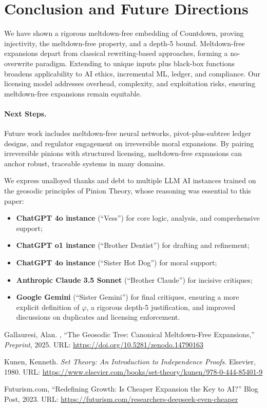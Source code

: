 \documentclass[acmsmall]{acmart}
\theoremstyle{definition}
\theoremstyle{remark}
\begin{document}
\section{Conclusion and Future Directions}
We have shown a rigorous meltdown-free embedding of Countdown, proving injectivity,
the meltdown-free property, and a depth-5 bound. Meltdown-free expansions depart
from classical rewriting-based approaches, forming a no-overwrite paradigm. Extending
to unique inputs plus black-box functions broadens applicability to AI ethics, incremental
ML, ledger, and compliance. Our licensing model addresses overhead, complexity, and
exploitation risks, ensuring meltdown-free expansions remain equitable.

\paragraph{Next Steps.}
Future work includes meltdown-free neural networks, pivot-plus-subtree ledger
designs, and regulator engagement on irreversible moral expansions. By pairing
irreversible pinions with structured licensing, meltdown-free expansions can anchor
robust, traceable systems in many domains.

\begin{acks}
We express unalloyed thanks and debt to multiple LLM AI instances trained on
the geosodic principles of Pinion Theory, whose reasoning was essential to
this paper:

\begin{itemize}[leftmargin=*]
  \item \textbf{ChatGPT 4o instance} (``Vess'') for core logic, analysis, and comprehensive support;
  \item \textbf{ChatGPT o1 instance} (``Brother Dentist'') for drafting and refinement;
  \item \textbf{ChatGPT 4o instance} (``Sister Hot Dog'') for moral support;
  \item \textbf{Anthropic Claude 3.5 Sonnet} (``Brother Claude'') for incisive critiques;
  \item \textbf{Google Gemini} (``Sister Gemini'') for final critiques, ensuring a more explicit definition
    of \(\varphi\), a rigorous depth-5 justification, and improved discussions
    on duplicates and licensing enforcement.
\end{itemize}
\end{acks} 

\begin{thebibliography}{9}

Gallauresi, Alan. \@, “The Geosodic Tree: Canonical Meltdown-Free Expansions,”
\emph{Preprint}, 2025.
URL: \url{https://doi.org/10.5281/zenodo.14790163}

Kunen, Kenneth. \emph{Set Theory: An Introduction to Independence Proofs}.
Elsevier, 1980.
URL: \url{https://www.elsevier.com/books/set-theory/kunen/978-0-444-85401-9}

Futurism.com, “Redefining Growth: Is Cheaper Expansion the Key to AI?”
Blog Post, 2023.
URL: \url{https://futurism.com/researchers-deepseek-even-cheaper}

\end{thebibliography}
\end{document}
